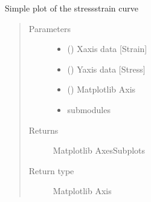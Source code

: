 \documentclass[letterpaper,10pt,english]{sphinxmanual}
\begin{document}
\begin{fulllineitems}
\begin{fulllineitems}
\label{\detokenize{openfdem:openfdem.openfdem.Model.plot_stress_strain}}
Simple plot of the stress\sphinxhyphen{}strain curve
\begin{quote}\begin{description}
\item[{Parameters}] \leavevmode\begin{itemize}
\item {} 
 () \textendash{} X\sphinxhyphen{}axis data {[}Strain{]}

\item {} 
 () \textendash{} Y\sphinxhyphen{}axis data {[}Stress{]}

\item {} 
 () \textendash{} Matplotlib Axis

\item {} 
 \textendash{}  submodules

\end{itemize}

\item[{Returns}] \leavevmode
Matplotlib AxesSubplots

\item[{Return type}] \leavevmode
Matplotlib Axis


\end{description}
\end{quote}
\end{fulllineitems}
\end{fulllineitems}
\end{document}
